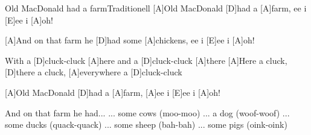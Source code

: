 \documentclass[../main.tex]{subfiles}
\begin{document}
\begin{songwithoutpagebreak}{Old MacDonald had a farm}{Traditionell}{}
[A]Old MacDonald [D]had a [A]farm, ee i [E]ee i [A]oh!

[A]And on that farm he [D]had some [A]chickens, ee i [E]ee i [A]oh!

With a [D]cluck-cluck [A]here and a [D]cluck-cluck [A]there
[A]Here a cluck, [D]there a cluck, [A]everywhere a [D]cluck-cluck

[A]Old MacDonald [D]had a [A]farm, [A]ee i [E]ee i [A]oh!


And on that farm he had...
\hh... some cows (moo-moo)
\hh... a dog (woof-woof)
\hh... some ducks (quack-quack)
\hh... some sheep (bah-bah)
\hh... some pigs (oink-oink)
\end{songwithoutpagebreak}
\end{document}
